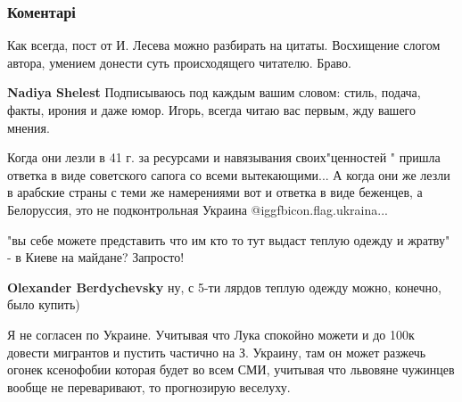 
 
 
 
 
\subsubsection{Коментарі}
\label{sec:12_11_2021.fb.lesev_igor.1.migranty_rnbo_zelja.cmt}

\begin{itemize} %

Как всегда, пост от И. Лесева можно разбирать на цитаты. Восхищение слогом
автора, умением донести суть происходящего читателю. Браво.

\begin{itemize} %
\textbf{Nadiya Shelest} Подписываюсь под каждым вашим словом: стиль, подача,
факты, ирония и даже юмор. Игорь, всегда читаю вас первым, жду вашего мнения.
\end{itemize} %


Когда они лезли в 41 г. за ресурсами и навязывания своих"ценностей " пришла
ответка в виде советского сапога со всеми вытекающими... А когда они же лезли в
арабские страны с теми же намерениями вот и ответка в виде беженцев, а
Белоруссия, это не подконтрольная Украина @igg{fbicon.flag.ukraina}...


"вы себе можете представить что им кто то тут выдаст теплую одежду и жратву" -
в Киеве на майдане? Запросто!

\begin{itemize} %
\textbf{Olexander Berdychevsky} ну, с 5-ти лярдов теплую одежду можно, конечно, было купить)
\end{itemize} %


Я не согласен по Украине. Учитывая что Лука спокойно можети и до 100к довести
мигрантов и пустить частично на З. Украину, там он может разжечь огонек
ксенофобии которая будет во всем СМИ, учитывая что львовяне чужинцев вообще не
переваривают, то прогнозирую веселуху.


\end{itemize}
